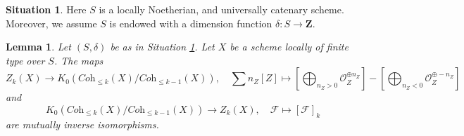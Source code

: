\documentclass{amsart}
\theoremstyle{plain}
\newtheorem{lemma}[subsection]{Lemma}
\theoremstyle{definition}
\newtheorem{situation}[subsection]{Situation}
\theoremstyle{remark}
\numberwithin{equation}{subsection}
\begin{document}
\begin{situation}
\label{situation-setup}
Here $S$ is a locally Noetherian, and universally catenary scheme.
Moreover, we assume $S$ is endowed with a dimension function
$\delta : S \longrightarrow \mathbf{Z}$.
\end{situation}

\begin{lemma}
\label{lemma-cycles-k-group}
Let $(S, \delta)$ be as in Situation \ref{situation-setup}.
Let $X$ be a scheme locally of finite type over $S$.
The maps
$$
Z_k(X)
\longrightarrow
K_0(\textit{Coh}_{\leq k}(X)/\textit{Coh}_{\leq k - 1}(X)),
\quad
\sum n_Z[Z] \mapsto
\left[\bigoplus\nolimits_{n_Z > 0} \mathcal{O}_Z^{\oplus n_Z}\right]
-
\left[\bigoplus\nolimits_{n_Z < 0} \mathcal{O}_Z^{\oplus -n_Z}\right]
$$
and
$$
K_0(\textit{Coh}_{\leq k}(X)/\textit{Coh}_{\leq k - 1}(X))
\longrightarrow
Z_k(X),\quad
\mathcal{F} \longmapsto [\mathcal{F}]_k
$$
are mutually inverse isomorphisms.
\end{lemma}
\end{document}
